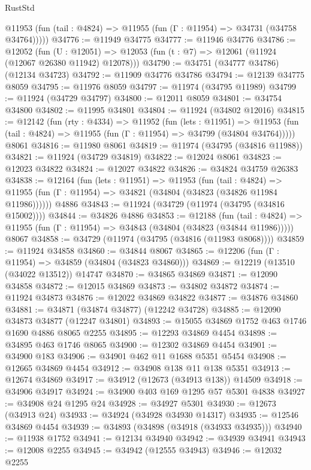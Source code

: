 \begin{lexlean}{RustStd}
\begin{coremodule}
{\begin{coremodule}
{{{{{{{{{{{{{{{{{{{{{{{{{{{{{{{{{{{{{{{{{{{{{{{{{{{{{{{{{{{{{{{{{{{{{{{{{{{{{{{{      @11953 (fun (tail : @4824) => @11955 (fun (Γ : @11954) => @34731 (@34758 @34764)))))
@34776 := @11949 @34775
@34777 := @11946 @34776
@34786 := @12052
    (fun (U : @12051) => @12053 (fun (t : @7) => @12061 (@11924 (@12067 @26380 @11942) @12078)))
@34790 := @34751 (@34777 @34786) (@12134 @34723)
@34792 := @11909 @34776 @34786
@34794 := @12139 @34775 @8059
@34795 := @11976 @8059
@34797 := @11974 (@34795 @11989)
@34799 := @11924 (@34729 @34797)
@34800 := @12011 @8059
@34801 := @34754 @34800
@34802 := @11995 @34801
@34804 := @11924 (@34802 @12016)
@34815 := @12142
    (fun (rty : @4334) =>
    @11952
      (fun (lets : @11951) =>
      @11953 (fun (tail : @4824) => @11955 (fun (Γ : @11954) => @34799 (@34804 @34764)))))
    @8061
@34816 := @11980 @8061
@34819 := @11974 (@34795 (@34816 @11988))
@34821 := @11924 (@34729 @34819)
@34822 := @12024 @8061
@34823 := @12023 @34822
@34824 := @12027 @34822
@34826 := @34824 @34759 @26383
@34838 := @12164
    (fun (lets : @11951) =>
    @11953
      (fun (tail : @4824) =>
      @11955 (fun (Γ : @11954) => @34821 (@34804 (@34823 (@34826 @11984 @11986))))))
    @4886
@34843 := @11924 (@34729 (@11974 (@34795 (@34816 @15002))))
@34844 := @34826 @4886
@34853 := @12188
    (fun (tail : @4824) => @11955 (fun (Γ : @11954) => @34843 (@34804 (@34823 (@34844 @11986)))))
    @8067
@34858 := @34729 (@11974 (@34795 (@34816 (@11983 @8068))))
@34859 := @11924 @34858
@34860 := @34844 @8067
@34865 := @12206 (fun (Γ : @11954) => @34859 (@34804 (@34823 @34860)))
@34869 := @12219 (@13510 (@34022 @13512)) @14747
@34870 := @34865 @34869
@34871 := @12090 @34858
@34872 := @12015 @34869
@34873 := @34802 @34872
@34874 := @11924 @34873
@34876 := @12022 @34869 @34822
@34877 := @34876 @34860
@34881 := @34871 (@34874 @34877) (@12242 @34728)
@34885 := @12090 @34873 @34877 (@12247 @34801)
@34893 := @15055 @34869 @1752 @463 @1746 @1690 @4886 @8065 @2255
@34895 := @12293 @34869 @4454
@34898 := @34895 @463 @1746 @8065
@34900 := @12302 @34869 @4454
@34901 := @34900 @183
@34906 := @34901 @462 @11 @1688 @5351 @5454
@34908 := @12665 @34869 @4454
@34912 := @34908 @138 @11 @138 @5351
@34913 := @12674 @34869
@34917 := @34912 (@12673 (@34913 @138)) @14509
@34918 := @34906 @34917
@34924 := @34900 @403 @169 @1295 @57 @5301 @4838
@34927 := @34908 @24 @1295 @24
@34928 := @34927 @5301
@34930 := @12673 (@34913 @24)
@34933 := @34924 (@34928 @34930 @14317)
@34935 := @12546 @34869 @4454
@34939 := @34893 (@34898 (@34918 (@34933 @34935)))
@34940 := @11938 @1752
@34941 := @12134 @34940
@34942 := @34939 @34941
@34943 := @12008 @2255
@34945 := @34942 (@12555 @34943)
@34946 := @12032 @2255
}}}}}}}}}}}}}}}}}}}}}}}}}}}}}}}}}}}}}}}}}}}}}}}}}}}}}}}}}}}}}}}}}}}}}}}}}}}}}}}}
\end{coremodule}}
\end{coremodule}
\end{lexlean}
